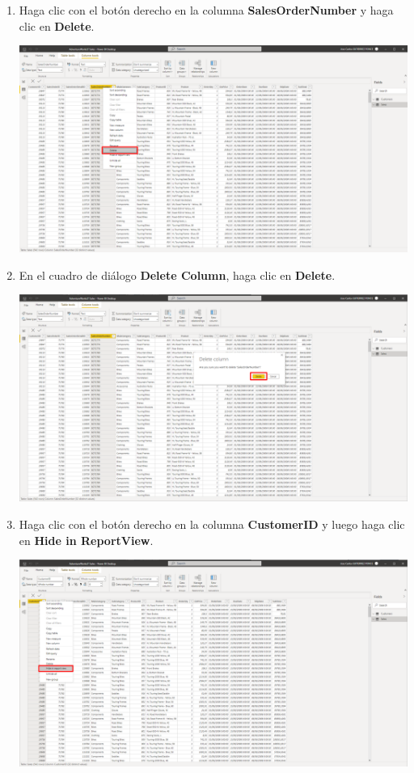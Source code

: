 \documentclass[12pt,letterpaper]{article}
\newcommand\tab[1][1cm]{\hspace*{#1}}
\begin{document}
\begin{enumerate}[\tab 1.]
\begin{center}
        \end{center}
        \item Haga clic con el botón derecho en la columna \textbf{SalesOrderNumber} y haga clic en \textbf{Delete}.
        \begin{center}
            \includegraphics[width=13cm]{./img/img38.png}
        \end{center}
        \item En el cuadro de diálogo \textbf{Delete Column}, haga clic en \textbf{Delete}.
        \begin{center}
            \includegraphics[width=13cm]{./img/img39.png}
        \end{center}
        \item Haga clic con el botón derecho en la columna \textbf{CustomerID} y luego haga clic en \textbf{Hide in ReportView}.
        \begin{center}
            \includegraphics[width=13cm]{./img/img40.png}

\end{center}
\end{enumerate}
\end{document}
